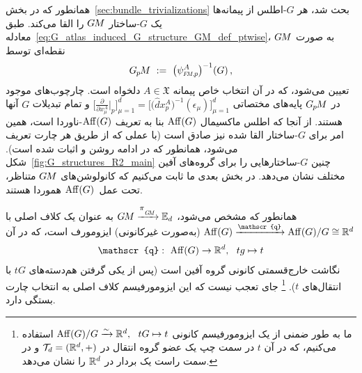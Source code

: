 همانطور که در بخش~\ref{sec:bundle_trivializations} بحث شد، هر $G$-اطلس از پیمانه‌ها یک $G$-ساختار $G\mkern-1.4muM$ را القا می‌کند.
طبق معادله~\eqref{eq:G_atlas_induced_G_structure_GM_def_ptwise}، $G\mkern-1.4muM$ به صورت نقطه‌ای توسط
\begin{align}
	\GpM\ :=\ \big( \psiFMp^A \big)^{-1} (G) \,,
\end{align}
تعیین می‌شود، که در آن انتخاب خاص پیمانه $A \in \mathfrak{X}$ دلخواه است.
چارچوب‌های موجود در $G_{\mkern-1.3mu p}\mkern-1.2muM$ پایه‌های مختصاتی
$\big[ \frac{\partial}{\partial x^A_\mu} \big|_p \big]_{\mu=1}^d = \big[\big(\hat{d}x_p^A \big)^{-1} (\epsilon_\mu) \big]_{\mu=1}^d$
و تمام تبدیلات $G$ آنها هستند.
از آنجا که اطلس ماکسیمال $\operatorname{Aff}(G)$ بنا به تعریف $\operatorname{Aff}(G)$-ناوردا است، همین امر برای $G$-ساختار القا شده نیز صادق است (با عملی که از طریق هر چارت تعریف می‌شود، همانطور که در ادامه روشن و اثبات شده است).
شکل~\ref{fig:G_structures_R2_main} چنین $G$-ساختارهایی را برای گروه‌های آفین مختلف نشان می‌دهد.
در بخش بعدی ما ثابت می‌کنیم که کانولوشن‌های $G\mkern-1.4muM$ متناظر، تحت عمل~$\operatorname{Aff}(G)$ هموردا هستند.


همانطور که مشخص می‌شود، $\GM \xrightarrow{\piGM} \Euc_d$ به عنوان یک کلاف اصلی با $\Aff(G) \xrightarrow{\mathscr{q}} \Aff(G)/G \cong \R^d$ (به‌صورت غیرکانونی) ایزومورف است، که در آن
\begin{align}
	\mathscr{q}:\ \Aff(G) \to \R^d,\ \ tg \mapsto t
\end{align}
نگاشت خارج‌قسمتی کانونی گروه آفین است (پس از یکی گرفتن هم‌دسته‌های $tG$ با انتقال‌های $t$).%
\footnote{
	ما به طور ضمنی از یک ایزومورفیسم کانونی $\operatorname{Aff}(G)/G \xrightarrow{\sim} \mathbb{R}^d,\ \ tG \mapsto t$ استفاده می‌کنیم، که در آن $t$ در سمت چپ یک عضو گروه انتقال در $\mathcal{T}_d = (\mathbb{R}^d,+)$ و در سمت راست یک بردار در $\mathbb{R}^d$ را نشان می‌دهد.
}
جای تعجب نیست که این ایزومورفیسم کلاف اصلی به انتخاب چارت بستگی دارد.

